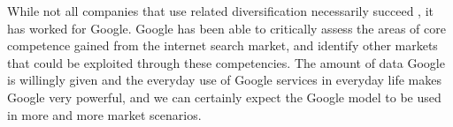 While not all companies that use related diversification necessarily succeed \cite{johnson2008exploring}, it has worked for Google. Google has been able to critically assess the areas of core competence gained from the internet search market, and identify other markets that could be exploited through these competencies. The amount of data Google is willingly given and the everyday use of Google services in everyday life makes Google very powerful, and we can certainly expect the Google model to be used in more and more market scenarios.

